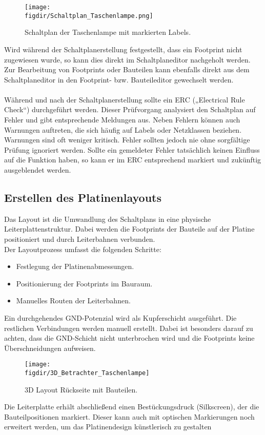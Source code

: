\begin{figure}[h]  
    \centering  
    \texttt{[image: \\figdir/Schaltplan\_Taschenlampe.png]}  
    \caption{Schaltplan der Taschenlampe mit markierten Labels.}  
    \label{fig:Abbildung 9}
\end{figure}  

\noindent
Wird während der Schaltplanerstellung festgestellt, dass ein Footprint nicht zugewiesen wurde, so kann dies direkt im Schaltplaneditor nachgeholt werden.\\ 
Zur Bearbeitung von Footprints oder Bauteilen kann ebenfalls direkt aus dem Schaltplaneditor in den Footprint- bzw. Bauteileditor gewechselt werden.\\
\\
Während und nach der Schaltplanerstellung sollte ein ERC („Electrical Rule Check“) durchgeführt werden. Dieser Prüfvorgang analysiert den Schaltplan auf Fehler und gibt entsprechende Meldungen aus.
Neben Fehlern können auch Warnungen auftreten, die sich häufig auf Labels oder Netzklassen beziehen. Warnungen sind oft weniger kritisch.
Fehler sollten jedoch nie ohne sorgfältige Prüfung ignoriert werden.
Sollte ein gemeldeter Fehler tatsächlich keinen Einfluss auf die Funktion haben, so kann er im ERC entsprechend markiert und zukünftig ausgeblendet werden.

\newpage

\subsection{Erstellen des Platinenlayouts}  
Das Layout ist die Umwandlung des Schaltplans in eine physische Leiterplattenstruktur. Dabei werden die Footprints der Bauteile auf der Platine positioniert und durch Leiterbahnen verbunden.\\

Der Layoutprozess umfasst die folgenden Schritte:  
\begin{itemize}  
    \item Festlegung der Platinenabmessungen.  
    \item Positionierung der Footprints im Bauraum.  
    \item Manuelles Routen der Leiterbahnen.  
\end{itemize}  

\noindent
Ein durchgehendes GND-Potenzial wird als Kupferschicht ausgeführt. Die restlichen Verbindungen werden manuell erstellt. Dabei ist besonders darauf zu achten, dass die GND-Schicht nicht unterbrochen wird und die Footprints keine Überschneidungen aufweisen.  

\begin{figure}[h]  
    \centering  
    \texttt{[image: \\figdir/3D\_Betrachter\_Taschenlampe]}  
    \caption{3D Layout Rückseite mit Bauteilen.} 
    \label{fig:Abbildung 10} 
\end{figure}  

\noindent
Die Leiterplatte erhält abschließend einen Bestückungsdruck (Silkscreen), der die Bauteilpositionen markiert.
Dieser kann auch mit optischen Markierungen noch erweitert werden, um das Platinendesign künstlerisch zu gestalten


